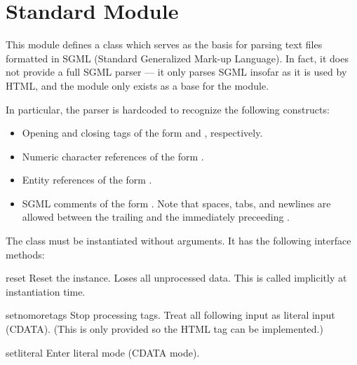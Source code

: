 \section{Standard Module }
\label{module-sgmllib}

This module defines a class  which serves as the
basis for parsing text files formatted in SGML (Standard Generalized
Mark-up Language).  In fact, it does not provide a full SGML parser
--- it only parses SGML insofar as it is used by HTML, and the module
only exists as a base for the  module.

In particular, the parser is hardcoded to recognize the following
constructs:

\begin{itemize}

\item
Opening and closing tags of the form
 and
, respectively.

\item
Numeric character references of the form .

\item
Entity references of the form .

\item
SGML comments of the form .  Note that
spaces, tabs, and newlines are allowed between the trailing
\samp{>} and the immediately preceeding \samp{--}.

\end{itemize}

The  class must be instantiated without arguments.
It has the following interface methods:


\begin{funcdesc}{reset}{}
Reset the instance.  Loses all unprocessed data.  This is called
implicitly at instantiation time.
\end{funcdesc}

\begin{funcdesc}{setnomoretags}{}
Stop processing tags.  Treat all following input as literal input
(CDATA).  (This is only provided so the HTML tag 
can be implemented.)
\end{funcdesc}

\begin{funcdesc}{setliteral}{}
Enter literal mode (CDATA mode).
\end{funcdesc}


